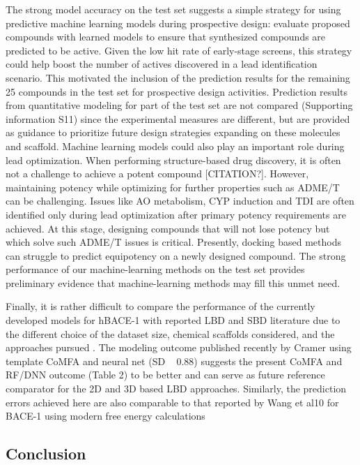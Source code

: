 The strong model accuracy on the test set suggests a simple strategy for using predictive machine learning models during prospective design:  evaluate proposed compounds with learned models to ensure that synthesized compounds are predicted to be active.  Given the low hit rate of early-stage screens, this strategy could help boost the number of actives discovered in a lead identification scenario.  This motivated the inclusion of the prediction results for the remaining 25 compounds in the test set for prospective design activities.  Prediction results from quantitative modeling for part of the test set are not compared (Supporting information S11) since the experimental measures are different, but are provided as guidance to prioritize future design strategies expanding on these molecules and scaffold.
Machine learning models could also play an important role during lead optimization. When performing structure-based drug discovery, it is often not a challenge to achieve a potent compound [CITATION?]. However, maintaining potency while optimizing for further properties such as ADME/T can be challenging. Issues like AO metabolism, CYP induction and TDI are often identified only during lead optimization after primary potency requirements are achieved. At this stage, designing compounds that will not lose potency but which solve such ADME/T issues is critical. Presently, docking based methods can struggle to predict equipotency on a newly designed compound. The strong performance of our machine-learning methods on the test set provides preliminary evidence that machine-learning methods may fill this unmet need.  

Finally, it is rather difficult to compare the performance of the currently developed models for hBACE-1 with reported LBD and SBD literature due to the different choice of the dataset size, chemical scaffolds considered, and the approaches pursued \cite{ambure2014advances, wu2016interaction}.  The modeling outcome published recently by Cramer \cite{cramer2015template} using template CoMFA and neural net (SD ~ 0.88) suggests the present CoMFA and RF/DNN outcome (Table 2) to be better and can serve as future reference comparator for the 2D and 3D based LBD approaches.  Similarly, the prediction errors achieved here are also comparable to that reported by Wang et al10 for BACE-1 using modern free energy calculations \cite{wang2015accurate, ciordia2016application}

\subsection{Conclusion}

